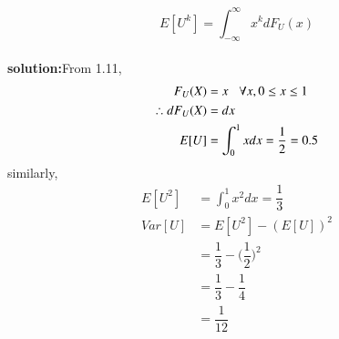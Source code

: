 \documentclass[journal,12pt,twocolumn]{IEEEtran}
\providecommand{\sbrak}[1]{\ensuremath{{}\left[#1\right]}}
\theoremstyle{remark}
\numberwithin{equation}{section}
\begin{document}
%
\begin{equation}
E\sbrak{U^k} = \int_{-\infty}^{\infty}x^kdF_{U}(x)
\end{equation}\\
\textbf{solution:}From 1.11,
\begin{align}
F_{U}(X)&=x \hspace{3mm}\forall x, 0\leq x\leq 1\nonumber\\
\therefore dF_{U}(X)&=dx\\
E[U]&=\int_{0}^{1}xdx=\dfrac{1}{2}=0.5
\end{align}
similarly,
\begin{align}
E[U^2]&=\int_{0}^{1}x^2dx=\dfrac{1}{3}\\
Var[U]&=E[U^2]-(E[U])^2\\
&=\dfrac{1}{3}-\Big(\dfrac{1}{2}\Big)^2\nonumber\\
&=\dfrac{1}{3}-\dfrac{1}{4}\nonumber\\
&=\dfrac{1}{12}\nonumber
\end{align}
\end{document}

